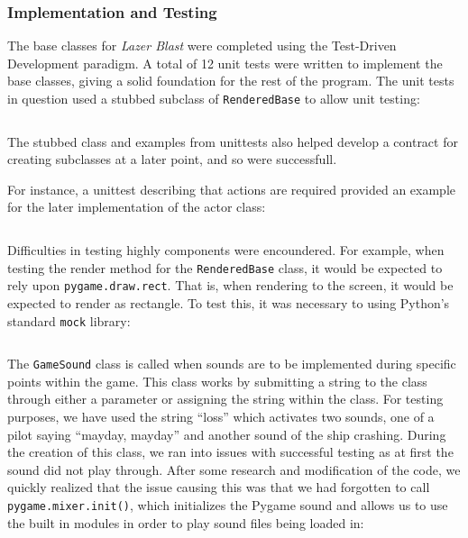 \subsubsection*{Implementation and Testing}
%
%

The base classes for \textit{Lazer Blast} were completed using
the Test-Driven Development paradigm.  A total of 12 unit tests
were written to implement the base classes, giving a solid foundation
for the rest of the program.  The unit tests in question used
a stubbed subclass of \texttt{RenderedBase} to allow unit
testing:

\inputminted[baselinestretch=1]{python}{../code/testing_mock_subclass.py}

The stubbed class and examples from unittests also helped develop
a contract for creating subclasses at a later point, and so were
successfull.

For instance, a unittest describing that actions are required provided
an example for the later implementation of the actor class:

\inputminted[baselinestretch=1]{python}{../code/testing_actions_required.py}

Difficulties in testing highly components were encoundered.  For
example, when testing the render method for the
\texttt{RenderedBase} class, it would be expected to rely
upon \texttt{pygame.draw.rect}.  That is, when rendering to
the screen, it would be expected to render as rectangle.  To test this,
it was necessary to using Python's standard \texttt{mock}
library:

\inputminted[baselinestretch=1]{python}{../code/testing_mocking.py}



The \texttt{GameSound} class is called when sounds are
to be implemented during specific points within the game. This class
works by submitting a string to the class through either a parameter
or assigning the string within the class. For testing purposes, we
have used the string “loss” which activates two sounds, one of a
pilot saying “mayday, mayday” and another sound of the ship
crashing.  During the creation of this class, we ran into issues
with successful testing as at first the sound did not play through.
After some research and modification of the code, we quickly
realized that the issue causing this was that we had forgotten to
call \texttt{pygame.mixer.init()}, which initializes the
Pygame sound and allows us to use the built in modules in order to
play sound files being loaded in:

